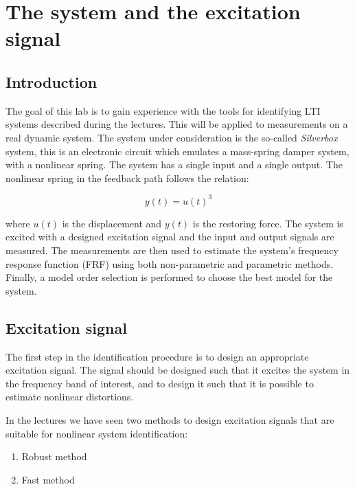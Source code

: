 \chapter{The system and the excitation signal}
\section{Introduction}
The goal of this lab is to gain experience 
with the tools for identifying LTI systems described 
during the lectures. This will be applied to measurements on a real dynamic system. 
The system under consideration is the so-called \textit{Silverbox} system,
this is an electronic circuit which emulates a mass-spring damper system, with a nonlinear spring.  The system has a single input and a single output. The nonlinear spring in the feedback path follows the relation:

\begin{equation}
    y(t) = u(t)^3
\end{equation}

where $u(t)$ is the displacement and $y(t)$ is the restoring force. The system is excited with a designed excitation signal and the input and output signals are measured. The measurements are then used to estimate the system's frequency response function (FRF) using both non-parametric and parametric methods. Finally, a model order selection is performed to choose the best model for the system.

\section{Excitation signal}
The first step in the identification procedure is to design an appropriate excitation signal. 
The signal should be designed such that it excites the system in the frequency band of interest, and to design it such that it is possible to estimate nonlinear distortions. 


In the lectures we have seen two methods to design excitation signals that are suitable for nonlinear system identification:
\begin{enumerate}
    \item Robust method
    \item Fast method
\end{enumerate}

